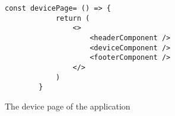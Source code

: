 \begin{figure}[htbp]
    \begin{lstlisting}[language=React]
        const devicePage= () => {
            return (
                <>
                    <headerComponent />
                    <deviceComponent />
                    <footerComponent />
                </>
            )
        }
    \end{lstlisting}
    \caption{The device page of the application}
    \label{fig:devicePage}
\end{figure}